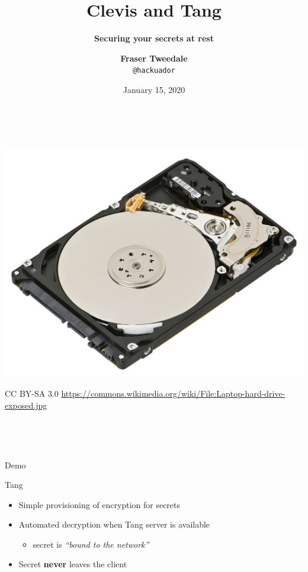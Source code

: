 \documentclass[ignorenonframetext,aspectratio=169]{beamer}
\title{\bf Clevis and Tang}
\subtitle{\bf Securing your secrets at rest}
\author{{\bf Fraser Tweedale}\\
    \texttt{@hackuador}\\
    \bigskip
    \def\svgwidth{4cm}
    }
\date{January 15, 2020}
\def\svgwidth{4cm}
\begin{document}
\frame{\titlepage}

\begin{frame}{~~}
\protect\hypertarget{section}{}

\begin{center}
\includegraphics[width=.6\columnwidth]{Laptop-hard-drive-exposed.jpg}
\end{center}
\tiny

CC BY-SA 3.0
\url{https://commons.wikimedia.org/wiki/File:Laptop-hard-drive-exposed.jpg}

\end{frame}

\begin{frame}{~~}
\protect\hypertarget{section-1}{}

\begin{center}
\def\svgwidth{.5\paperheight}

\end{center}

\end{frame}

\begin{frame}{~~}
\protect\hypertarget{section-2}{}

\begin{center}
\def\svgwidth{.6\columnwidth}

\end{center}

\end{frame}

\begin{frame}[plain]
\centering
\huge Demo
\end{frame}

\begin{frame}{Tang}
\protect\hypertarget{tang}{}

\begin{itemize}
\item Simple provisioning of encryption for secrets
\item Automated decryption when Tang server is available

  \begin{itemize}
  \item secret is \emph{``bound to the network''}
  \end{itemize}
\item
  Secret \textbf{never} leaves the client
\end{itemize}

\end{frame}
\end{document}

